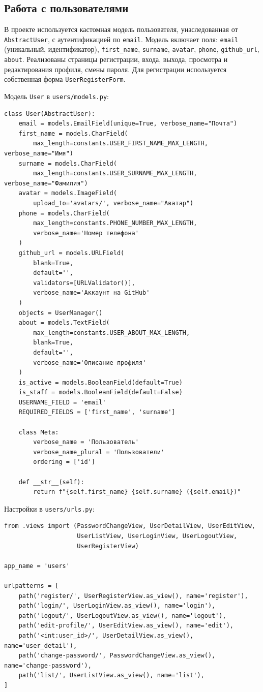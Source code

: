 \documentclass[bachelor, och, pract]{../SCWorks}
\begin{document}
\subsection{Работа с пользователями}

В проекте используется кастомная модель пользователя, унаследованная от \texttt{AbstractUser}, с аутентификацией по \texttt{email}.
Модель включает поля: \texttt{email} (уникальный, идентификатор), \texttt{first\_name}, \texttt{surname}, \texttt{avatar}, \texttt{phone}, \texttt{github\_url}, \texttt{about}.
Реализованы страницы регистрации, входа, выхода, просмотра и редактирования профиля, смены пароля.
Для регистрации используется собственная форма \texttt{UserRegisterForm}.

Модель \texttt{User} в \texttt{users/models.py}:

\begin{lstlisting}
class User(AbstractUser):
    email = models.EmailField(unique=True, verbose_name="Почта")
    first_name = models.CharField(
        max_length=constants.USER_FIRST_NAME_MAX_LENGTH, verbose_name="Имя")
    surname = models.CharField(
        max_length=constants.USER_SURNAME_MAX_LENGTH, verbose_name="Фамилия")
    avatar = models.ImageField(
        upload_to='avatars/', verbose_name="Аватар")
    phone = models.CharField(
        max_length=constants.PHONE_NUMBER_MAX_LENGTH,
        verbose_name='Номер телефона'
    )
    github_url = models.URLField(
        blank=True,
        default='',
        validators=[URLValidator()],
        verbose_name='Аккаунт на GitHub'
    )
    objects = UserManager()
    about = models.TextField(
        max_length=constants.USER_ABOUT_MAX_LENGTH,
        blank=True,
        default='',
        verbose_name='Описание профиля'
    )
    is_active = models.BooleanField(default=True)
    is_staff = models.BooleanField(default=False)
    USERNAME_FIELD = 'email'
    REQUIRED_FIELDS = ['first_name', 'surname']

    class Meta:
        verbose_name = 'Пользователь'
        verbose_name_plural = 'Пользователи'
        ordering = ['id']

    def __str__(self):
        return f"{self.first_name} {self.surname} ({self.email})"
\end{lstlisting}

Настройки в \texttt{users/urls.py}:

\begin{lstlisting}
from .views import (PasswordChangeView, UserDetailView, UserEditView,
                    UserListView, UserLoginView, UserLogoutView,
                    UserRegisterView)

app_name = 'users'

urlpatterns = [
    path('register/', UserRegisterView.as_view(), name='register'),
    path('login/', UserLoginView.as_view(), name='login'),
    path('logout/', UserLogoutView.as_view(), name='logout'),
    path('edit-profile/', UserEditView.as_view(), name='edit'),
    path('<int:user_id>/', UserDetailView.as_view(), name='user_detail'),
    path('change-password/', PasswordChangeView.as_view(), name='change-password'),
    path('list/', UserListView.as_view(), name='list'),
]
\end{lstlisting}
\end{document}

